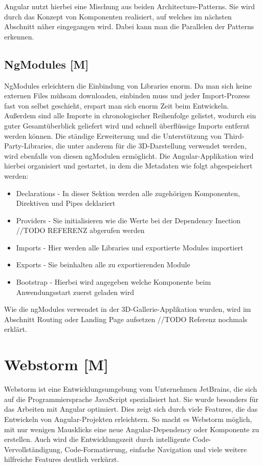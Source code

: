 Angular nutzt hierbei eine Mischung aus beiden Architecture-Patterns. Sie wird durch das Konzept von Komponenten realisiert, auf welches im nächsten Abschnitt näher eingegangen wird. Dabei kann man die Parallelen der Patterns erkennen.
\cite{MVVM}

\subsection{NgModules [M]}\label{sec:NgModules}
NgModules erleichtern die Einbindung von Libraries enorm. Da man sich keine externen Files mühsam downloaden, einbinden muss und jeder Import-Prozess fast von selbst geschieht, erspart man sich enorm Zeit beim Entwickeln. Außerdem sind alle Importe in chronologischer Reihenfolge gelistet, wodurch ein guter Gesamtüberblick geliefert wird und schnell überflüssige Imports entfernt werden können. Die ständige Erweiterung und die Unterstützung von Third-Party-Libraries, die unter anderem für die 3D-Darstellung verwendet werden, wird ebenfalls von diesen ngModulen ermöglicht. Die Angular-Applikation wird hierbei organisiert und gestartet, in dem die Metadaten wie folgt abgespeichert werden:

\begin{itemize}
  \item Declarations - In dieser Sektion werden alle zugehörigen Komponenten, Direktiven und Pipes deklariert 
  \item Providers - Sie initialisieren wie die Werte bei der Dependency Inection //TODO REFERENZ abgerufen werden \cite{AngularProviders}
  \item Imports - Hier werden alle Libraries und exportierte Modules importiert
  \item Exports - Sie beinhalten alle zu exportierenden Module
  \item Bootstrap - Hierbei wird angegeben welche Komponente beim Anwendungsstart zuerst geladen wird
\end{itemize}

Wie die ngModules verwendet in der 3D-Gallerie-Applikation wurden, wird im Abschnitt Routing oder Landing Page aufsetzen //TODO Referenz nochmals erklärt.
\cite{AngularNgModules}
\cite{AngularNgModulesAPI}
\cite{AngularBuch}


\section{Webstorm [M]}
Webstorm ist eine Entwicklungsumgebung vom Unternehmen JetBrains, die sich auf die Programmiersprache JavaScript spezialisiert hat. Sie wurde besonders für das Arbeiten mit Angular optimiert. Dies zeigt sich durch viele Features, die das Entwickeln von Angular-Projekten erleichtern. So macht es Webstorm möglich, mit nur wenigen Mausklicks eine neue Angular-Dependency oder Komponente zu erstellen. Auch wird die Entwicklungszeit durch intelligente Code-Vervollständigung, Code-Formatierung, einfache Navigation und viele weitere hilfreiche Features deutlich verkürzt.


